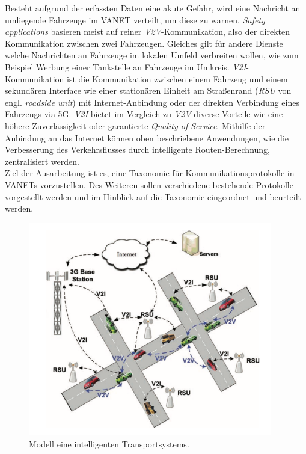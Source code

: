 \documentclass[english,runningheads,a4paper]{llncs}[2018/03/10]
\begin{document}
Besteht aufgrund der erfassten Daten eine akute Gefahr, wird eine Nachricht an umliegende Fahrzeuge im VANET verteilt, um diese zu warnen.
\textit{Safety applications} basieren meist auf reiner \textit{V2V}-Kommunikation, also der direkten Kommunikation zwischen zwei Fahrzeugen.
Gleiches gilt für andere Dienste welche Nachrichten an Fahrzeuge im lokalen Umfeld verbreiten wollen, wie zum Beispiel Werbung einer Tankstelle an Fahrzeuge im Umkreis.
\textit{V2I}-Kommunikation ist die Kommunikation zwischen einem Fahrzeug und einem sekundären Interface wie einer stationären Einheit am Straßenrand (\textit{RSU} von engl. \textit{roadside unit}) mit Internet-Anbindung oder der direkten Verbindung eines Fahrzeugs via 5G\@.
\textit{V2I} bietet im Vergleich zu \textit{V2V} diverse Vorteile wie eine höhere Zuverlässigkeit oder garantierte \textit{Quality of Service}.
Mithilfe der Anbindung an das Internet können oben beschriebene Anwendungen, wie die Verbesserung des Verkehrsflusses durch intelligente Routen-Berechnung, zentralisiert werden\cite{conti2013mobile}.\\
Ziel der Ausarbeitung ist es, eine Taxonomie für Kommunikationsprotokolle in VANETs vorzustellen.
Des Weiteren sollen verschiedene bestehende Protokolle vorgestellt werden und im Hinblick auf die Taxonomie eingeordnet und beurteilt werden.

\begin{figure}[h]
  \centering
  \includegraphics[width=0.95\textwidth]{images/its-modell.png}
  \caption{Modell eine intelligenten Transportsystems\cite{conti2013mobile}.}
  \label{fig:its-modell}
\end{figure}
\end{document}
